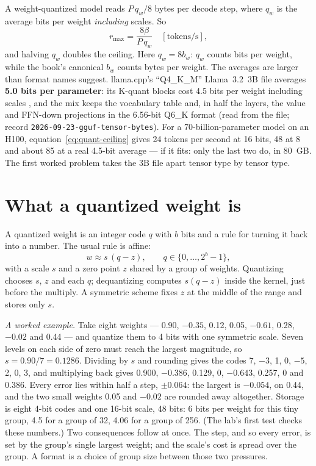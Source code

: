 A weight-quantized model reads $P\,q_w/8$ bytes per decode step, where $q_w$
is the average bits per weight \emph{including} scales. So
\begin{equation}
r_{\max} = \frac{8\beta}{P\,q_w}\quad[\text{tokens/s}],
\label{eq:quant-ceiling}
\end{equation}
and halving $q_w$ doubles the ceiling. Here $q_w=8b_w$: $q_w$ counts bits
per weight, while the book's canonical $b_w$ counts bytes per weight.
The averages are larger than format
names suggest. llama.cpp's ``Q4\_K\_M'' Llama~3.2~3B file averages
\textbf{5.0 bits per parameter}: its K-quant blocks cost 4.5 bits per weight
including scales \cite{kawrakow2023kquants}, and the mix keeps the vocabulary
table and, in half the layers, the value and FFN-down projections in the
6.56-bit Q6\_K format (read from the file; record
\texttt{2026-09-23-gguf-tensor-bytes}). For a 70-billion-parameter model on an
H100, equation~\eqref{eq:quant-ceiling} gives 24 tokens per second at 16 bits,
48 at 8 and about 85 at a real 4.5-bit average --- if it fits: only the last
two do, in 80~GB. The first worked problem takes the 3B file apart tensor type
by tensor type.

\section{What a quantized weight is}

A quantized weight is an integer code $q$ with $b$ bits and a rule for turning
it back into a number. The usual rule is affine:
\begin{equation}
w \approx s\,(q - z),\qquad q\in\{0,\dots,2^{b}-1\},
\label{eq:affine-quant}
\end{equation}
with a scale $s$ and a zero point $z$ shared by a group of weights. Quantizing
chooses $s$, $z$ and each $q$; dequantizing computes $s(q-z)$ inside the
kernel, just before the multiply. A symmetric scheme fixes $z$ at the middle of
the range and stores only $s$.

\emph{A worked example.} Take eight weights --- 0.90, $-0.35$, 0.12, 0.05,
$-0.61$, 0.28, $-0.02$ and 0.44 --- and quantize them to 4 bits with one
symmetric scale. Seven levels on each side of zero must reach the largest
magnitude, so $s = 0.90/7 = 0.1286$. Dividing by $s$ and rounding gives the
codes 7, $-3$, 1, 0, $-5$, 2, 0, 3, and multiplying back gives 0.900, $-0.386$,
0.129, 0, $-0.643$, 0.257, 0 and 0.386. Every error lies within half a step,
$\pm 0.064$: the largest is $-0.054$, on 0.44, and the two small weights 0.05
and $-0.02$ are rounded away altogether. Storage is eight 4-bit codes and one
16-bit scale, 48 bits: 6 bits per weight for this tiny group, 4.5 for a group of
32, 4.06 for a group of 256. (The lab's first test checks these numbers.) Two
consequences follow at once. The step, and so every error, is set by the
group's single largest weight; and the scale's cost is spread over the group.
A format is a choice of group size between those two pressures.

